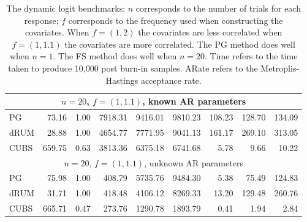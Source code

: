 \documentclass[11pt]{article}
\begin{document}
\begin{table}
\begin{tabular}{l r r r r r r r r }
\hline
\multicolumn{9}{c}{$n=20$, $f = (1,1.1)$, known AR parameters} \\
\hline
             PG   &    73.16 &     1.00 &   7918.31 &   9416.01 &   9810.23 &    108.23 &    128.70 &    134.09 \\ 
           dRUM   &    28.88 &     1.00 &   4654.77 &   7771.95 &   9041.13 &    161.17 &    269.10 &    313.05 \\ 
           CUBS   &   659.75 &     0.63 &   3813.36 &   6375.18 &   6741.68 &      5.78 &      9.66 &     10.22
 \\ %

\hline
\multicolumn{9}{c}{$n=20$, $f = (1,1.1)$, unknown AR parameters} \\
\hline
             PG   &    75.98 &     1.00 &    408.79 &   5735.76 &   9484.30 &      5.38 &     75.49 &    124.83 \\ 
           dRUM   &    31.71 &     1.00 &    418.48 &   4106.12 &   8269.33 &     13.20 &    129.48 &    260.76 \\ 
           CUBS   &   665.71 &     0.47 &    273.76 &   1290.78 &   1893.79 &      0.41 &      1.94 &      2.84
 \end{tabular}

 \caption{\label{tab:dynlogit-detail} The dynamic logit benchmarks: $n$
   corresponds to the number of trials for each response; $f$ corresponds to the
   frequency used when constructing the covariates.  When $f = (1,2)$ the
   covariates are less correlated when $f=(1,1.1)$ the covariates are more
   correlated.  The PG method does well when $n=1$.  The FS method does well
   when $n=20$.  Time refers to the time taken to produce 10,000 post burn-in
   samples.  ARate refers to the Metroplis-Hastings acceptance rate.}
\end{table}

\end{document}
